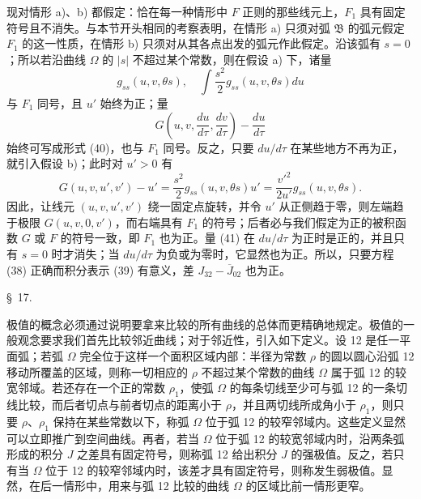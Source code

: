 \documentclass[11pt,a4paper,leqno]{article}
\begin{document}
现对情形 a)、b) 都假定：恰在每一种情形中 $F$ 正则的那些线元上，$F_1$ 具有固定符号且不消失。与本节开头相同的考察表明，在情形 a) 只须对弧 $\mathfrak{B}$ 的弧元假定 $F_1$ 的这一性质，在情形 b) 只须对从其各点出发的弧元作此假定。沿该弧有 $s=0$；所以若沿曲线 $\Omega$ 的 $|s|$ 不超过某个常数，则在假设 a) 下，诸量
\[
g_{ss}(u,v,\theta s),
\quad \int\frac{s^2}{2}g_{ss}(u,v,\theta s)du
\]
与 $F_1$ 同号，且 $u'$ 始终为正；量
\begin{equation}\tag{41}
G\left(u,v,\frac{du}{d\tau},\frac{dv}{d\tau}\right)-\frac{du}{d\tau}
\end{equation}
始终可写成形式 (40)，也与 $F_1$ 同号。反之，只要 $du/d\tau$ 在某些地方不再为正，就引入假设 b)；此时对 $u'>0$ 有
\[
G(u,v,u',v')-u'=\frac{s^2}{2}g_{ss}(u,v,\theta s)u'
=\frac{v'^2}{2u'}g_{ss}(u,v,\theta s).
\]
因此，让线元 $(u,v,u',v')$ 绕一固定点旋转，并令 $u'$ 从正侧趋于零，则左端趋于极限 $G(u,v,0,v')$，而右端具有 $F_1$ 的符号；后者必与我们假定为正的被积函数 $G$ 或 $F$ 的符号一致，即 $F_1$ 也为正。量 (41) 在 $du/d\tau$ 为正时是正的，并且只有 $s=0$ 时才消失；当 $du/d\tau$ 为负或为零时，它显然也为正。所以，只要方程 (38) 正确而积分表示 (39) 有意义，差 $J_{32}-\overline{J}_{02}$ 也为正。

\begin{center}{\large \S~17.}\end{center}

极值的概念必须通过说明要拿来比较的所有曲线的总体而更精确地规定。极值的一般观念要求我们首先比较邻近曲线；对于邻近性，引入如下定义。设 12 是任一平面弧；若弧 $\Omega$ 完全位于这样一个面积区域内部：半径为常数 $\rho$ 的圆以圆心沿弧 12 移动所覆盖的区域，则称一切相应的 $\rho$ 不超过某个常数的曲线 $\Omega$ 属于弧 12 的较宽邻域。若还存在一个正的常数 $\rho_1$，使弧 $\Omega$ 的每条切线至少可与弧 12 的一条切线比较，而后者切点与前者切点的距离小于 $\rho$，并且两切线所成角小于 $\rho_1$，则只要 $\rho$、$\rho_1$ 保持在某些常数以下，称弧 $\Omega$ 位于弧 12 的较窄邻域内。这些定义显然可以立即推广到空间曲线。再者，若当 $\Omega$ 位于弧 12 的较宽邻域内时，沿两条弧形成的积分 $J$ 之差具有固定符号，则称弧 12 给出积分 $J$ 的强极值。反之，若只有当 $\Omega$ 位于 12 的较窄邻域内时，该差才具有固定符号，则称发生弱极值。显然，在后一情形中，用来与弧 12 比较的曲线 $\Omega$ 的区域比前一情形更窄。
\end{document}
